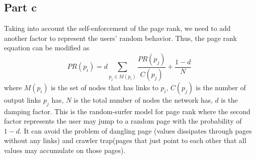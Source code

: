 \documentclass{article}
\begin{document}
\subsection{Part c}
Taking into account the self-enforcement of the page rank, we need to add another factor to represent the users' random behavior. Thus, the page rank equation can be modified as
\begin{equation*}
PR(p_i) = d\sum_{p_j\in{M(p_i)}}\frac{PR(p_j)}{C(p_j)} + \frac{1-d}{N}
\end{equation*}
where $M(p_i)$ is the set of nodes that has links to $p_i$, $C(p_j)$ is the number of output links $p_j$ has, $N$ is the total number of nodes the network has, $d$ is the damping factor. This is the random-surfer model for page rank where the second factor represents the user may jump to a random page with the probability of $1-d$. It can avoid the problem of dangling page (values dissipates through pages without any links) and crawler trap(pages that just point to each other that all values may accumulate on those pages).
\end{document}

